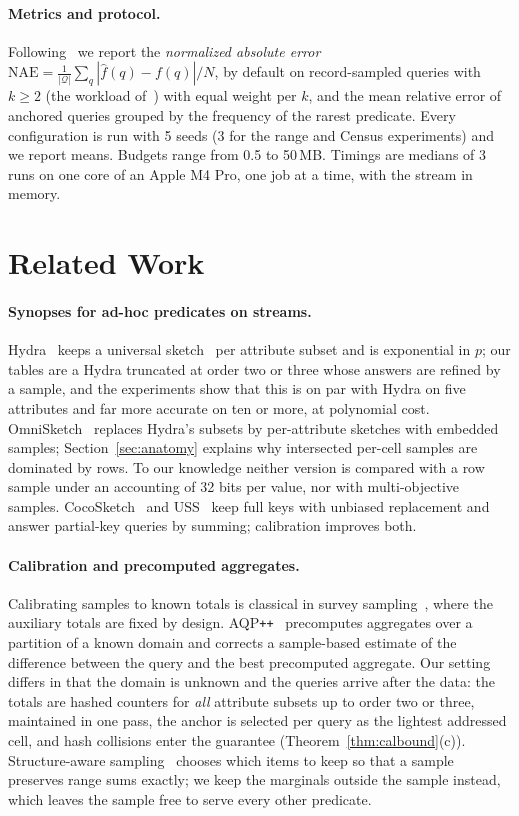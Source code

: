 \documentclass[sigconf]{acmart}
\newcommand{\omni}{OmniSketch\xspace}
\begin{document}
\paragraph{Metrics and protocol.} Following~\cite{omni} we report the \emph{normalized absolute error}
$\mathrm{NAE}=\frac1{|\mathcal Q|}\sum_q|\hat f(q)-f(q)|/N$, by default on record-sampled queries with
$k\ge2$ (the workload of~\cite{omni}) with equal weight per $k$, and the mean relative error of anchored
queries grouped by the frequency of the rarest predicate. Every configuration is run with 5 seeds (3 for
the range and Census experiments) and we report means. Budgets range from 0.5 to 50\,MB. Timings are
medians of 3 runs on one core of an Apple M4 Pro, one job at a time, with the stream in memory.



\section{Related Work}\label{sec:related}

\paragraph{Synopses for ad-hoc predicates on streams.} Hydra~\cite{hydra} keeps a universal
sketch~\cite{univmon} per attribute subset and is exponential in $p$; our tables are a Hydra truncated at
order two or three whose answers are refined by a sample, and the experiments show that this is on par
with Hydra on five attributes and far more accurate on ten or more, at polynomial cost. \omni~\cite{omni,omni-sr,omni-vldbj} replaces Hydra's subsets by
per-attribute sketches with embedded samples; Section~\ref{sec:anatomy} explains why intersected per-cell
samples are dominated by rows. To our knowledge neither version is compared with a row sample under an
accounting of 32 bits per value, nor with multi-objective samples. CocoSketch~\cite{coco} and
USS~\cite{ting-uss} keep full keys with unbiased replacement and answer partial-key queries by summing;
calibration improves both.

\paragraph{Calibration and precomputed aggregates.} Calibrating samples to known totals is classical in
survey sampling~\cite{sarndal,calibration}, where the auxiliary totals are fixed by design. AQP\texttt{++}~\cite{aqppp}
precomputes aggregates over a partition of a known domain and corrects a sample-based estimate of the
difference between the query and the best precomputed aggregate. Our setting differs in that the
domain is unknown and the queries arrive after the data: the totals are hashed counters for \emph{all}
attribute subsets up to order two or three, maintained in one pass, the anchor is selected per query as
the lightest addressed cell, and hash collisions enter the guarantee (Theorem~\ref{thm:calbound}(c)).
Structure-aware sampling~\cite{structure-aware} chooses which items to keep so that a sample preserves
range sums exactly; we keep the marginals outside the sample instead, which leaves the sample free to
serve every other predicate.
\end{document}
